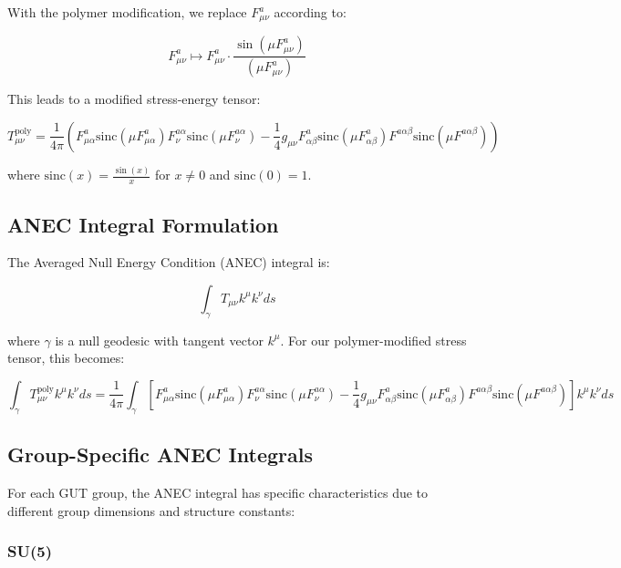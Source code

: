 \documentclass[11pt]{article}
\begin{document}
With the polymer modification, we replace $F^a_{\mu\nu}$ according to:

\begin{equation}
F^a_{\mu\nu} \mapsto F^a_{\mu\nu} \cdot \frac{\sin(\mu F^a_{\mu\nu})}{(\mu F^a_{\mu\nu})}
\end{equation}

This leads to a modified stress-energy tensor:

\begin{equation}
T^{\text{poly}}_{\mu\nu} = \frac{1}{4\pi}\left(F^a_{\mu\alpha}\text{sinc}(\mu F^a_{\mu\alpha})F^{a\alpha}_{\nu}\text{sinc}(\mu F^{a\alpha}_{\nu}) - \frac{1}{4}g_{\mu\nu}F^a_{\alpha\beta}\text{sinc}(\mu F^a_{\alpha\beta})F^{a\alpha\beta}\text{sinc}(\mu F^{a\alpha\beta})\right)
\end{equation}

where $\text{sinc}(x) = \frac{\sin(x)}{x}$ for $x \neq 0$ and $\text{sinc}(0) = 1$.

\subsection{ANEC Integral Formulation}

The Averaged Null Energy Condition (ANEC) integral is:

\begin{equation}
\int_{\gamma}T_{\mu\nu}k^\mu k^\nu ds
\end{equation}

where $\gamma$ is a null geodesic with tangent vector $k^\mu$. For our polymer-modified stress tensor, this becomes:

\begin{equation}
\int_{\gamma}T^{\text{poly}}_{\mu\nu}k^\mu k^\nu ds = \frac{1}{4\pi}\int_{\gamma}\left[F^a_{\mu\alpha}\text{sinc}(\mu F^a_{\mu\alpha})F^{a\alpha}_{\nu}\text{sinc}(\mu F^{a\alpha}_{\nu}) - \frac{1}{4}g_{\mu\nu}F^a_{\alpha\beta}\text{sinc}(\mu F^a_{\alpha\beta})F^{a\alpha\beta}\text{sinc}(\mu F^{a\alpha\beta})\right]k^\mu k^\nu ds
\end{equation}

\subsection{Group-Specific ANEC Integrals}

For each GUT group, the ANEC integral has specific characteristics due to different group dimensions and structure constants:

\subsubsection{SU(5)}
\end{document}
